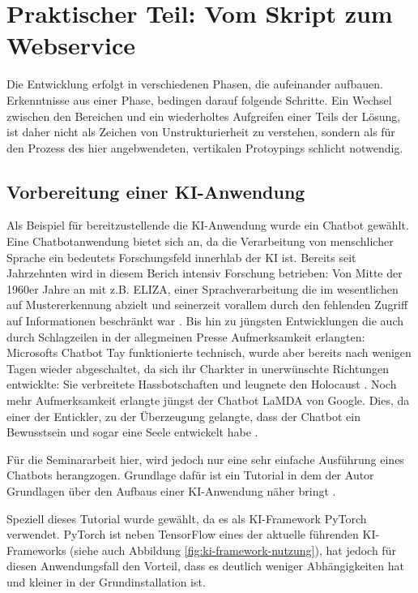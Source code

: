 \documentclass[12pt,oneside,titlepage,listof=totoc,bibliography=totoc]{scrartcl}
\begin{document}
\newpage
\section{Praktischer Teil: Vom Skript zum Webservice}

Die Entwicklung erfolgt in verschiedenen Phasen, die aufeinander aufbauen. Erkenntnisse aus einer Phase, bedingen darauf folgende Schritte. Ein Wechsel zwischen den Bereichen und ein wiederholtes Aufgreifen einer Teils der Lösung, ist daher nicht als Zeichen von Unstrukturierheit zu verstehen, sondern als für den Prozess des hier angebwendeten, vertikalen Protoypings schlicht notwendig. 


\subsection{Vorbereitung einer KI-Anwendung}



Als Beispiel für bereitzustellende die KI-Anwendung wurde ein Chatbot gewählt. Eine Chatbotanwendung bietet sich an, da die Verarbeitung von menschlicher Sprache ein bedeutets Forschungsfeld innerhlab der \ac{KI} ist. Bereits seit Jahrzehnten wird in diesem Berich intensiv Forschung betrieben: Von Mitte der 1960er Jahre an mit z.B. ELIZA, einer Sprachverarbeitung die im wesentlichen auf Mustererkennung abzielt und seinerzeit vorallem durch den fehlenden Zugriff auf Informationen beschränkt war \parencite{20-weizenbaum1983eliza}. Bis hin zu jüngsten Entwicklungen die auch durch Schlagzeilen in der allegmeinen Presse Aufmerksamkeit erlangten: Microsofts Chatbot Tay funktionierte technisch, wurde aber bereits nach wenigen Tagen wieder abgeschaltet, da sich ihr Charkter in unerwünschte Richtungen entwicklte: Sie verbreitete Hassbotschaften und leugnete den Holocaust \parencite{14-heise-tay-abschaltung}. Noch mehr Aufmerksamkeit erlangte jüngst der Chatbot LaMDA von Google. Dies, da einer der Entickler, zu der Überzeugung gelangte, dass der Chatbot ein Bewusstsein und sogar eine Seele entwickelt habe \parencite[]{10-heise-google-chatbot}.

Für die Seminararbeit hier, wird jedoch nur eine sehr einfache Ausführung eines Chatbots herangzogen. Grundlage dafür ist ein Tutorial in dem der Autor \citeauthor[]{50-howto-cahtbot} Grundlagen über den  Aufbaus einer KI-Anwendung näher bringt \parencite{50-howto-cahtbot}. 

Speziell dieses Tutorial wurde gewählt, da es als KI-Framework PyTorch verwendet. PyTorch ist neben TensorFlow eines der aktuelle führenden KI-Frameworks (siehe auch Abbildung \ref{fig:ki-framework-nutzung}), hat jedoch für diesen Anwendungsfall den Vorteil, dass es deutlich weniger Abhängigkeiten hat und kleiner in der Grundinstallation ist. 
\end{document}

